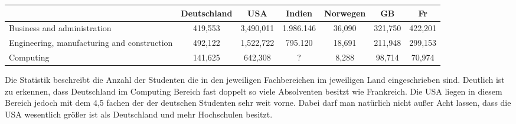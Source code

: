 \begin{table}[htp]
\begin{tabular}{|p{3cm}|c|c|c|c|c|c|}
\hline  	& Deutschland & USA & Indien  & Norwegen & GB & Fr \\ 
\hline  Business and administration & 419,553 & 3,490,011  & 1.986.146  & 36,090 & 321,750 & 422,201 \\ 
\hline  Engineering, manufacturing and construction & 492,122 & 1,522,722 & 795.120 & 18,691 & 211,948 & 299,153 \\ 
\hline  Computing &141,625  & 642,308 &? & 8,288 & 98,714 & 70,974\\ 
\hline 
\end{tabular} 
\end{table}
Die Statistik beschreibt die Anzahl der Studenten die in den jeweiligen Fachbereichen im jeweiligen Land eingeschrieben sind. Deutlich ist zu erkennen, dass Deutschland im Computing Bereich fast doppelt so viele Absolventen besitzt wie Frankreich. Die USA liegen in diesem Bereich jedoch mit dem 4,5 fachen der der deutschen Studenten sehr weit vorne. Dabei darf man natürlich nicht außer Acht lassen, dass die USA wesentlich größer ist als Deutschland und mehr Hochschulen besitzt.







